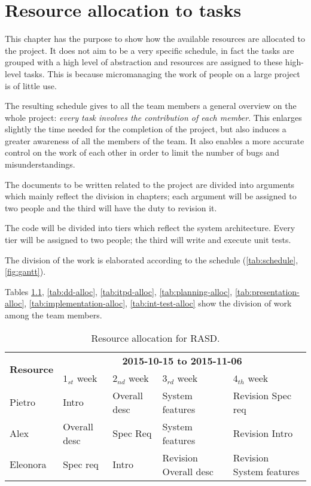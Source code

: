 \chapter{Resource allocation to tasks}
\label{chap:resource-allocation}

This chapter has the purpose to show how the available resources are allocated to the project. It does not aim to be a very specific schedule, in fact the tasks are grouped with a high level of abstraction and resources are assigned to these high-level tasks. This is because micromanaging the work of people on a large project is of little use.

The resulting schedule gives to all the team members a general overview on the whole project: \emph{every task involves the contribution of each member}.
This enlarges slightly the time needed for the completion of the project, but also induces a greater awareness of all the members of the team.
It also enables a more accurate control on the work of each other in order to limit the number of bugs and misunderstandings.

The documents to be written related to the project are divided into arguments which mainly reflect the division in chapters; each argument will be assigned to two people and the third will have the duty to revision it.

The code will be divided into tiers which reflect the system architecture. Every tier will be assigned to two people; the third will write and execute unit tests.

The division of the work is elaborated according to the schedule (\autoref{tab:schedule}, \autoref{fig:gantt}).

Tables \ref{tab:rasd-alloc}, \ref{tab:dd-alloc}, \ref{tab:itpd-alloc}, \ref{tab:planning-alloc}, \ref{tab:presentation-alloc}, \ref{tab:implementation-alloc}, \ref{tab:int-test-alloc} show the division of work among the team members.

\begin{table}
    \centering
    \begin{small}
    \begin{tabular}{| l | l | l | l | l |}
        \hline
        \multirow{2}{*}{\textbf{Resource}} & \multicolumn{4}{c|}{\textbf{2015-10-15 to 2015-11-06}} \\
        \cline{2-5}
        & $1_{st}$ week & $2_{nd}$ week & $3_{rd} $ week & $4_{th}$ week\\
        \hline
        Pietro      & Intro         & Overall desc   & System features        & Revision Spec req    \\
        Alex        & Overall desc  & Spec Req       & System features        & Revision Intro   \\
        Eleonora    & Spec req      & Intro          & Revision Overall desc  &    Revision System features  \\
        \hline
    \end{tabular}
    \end{small}
    \caption{Resource allocation for RASD.}
    \label{tab:rasd-alloc}
\end{table}

